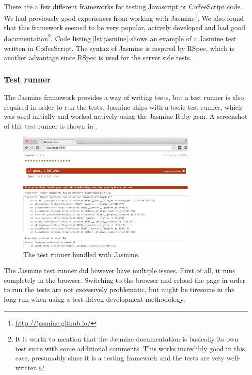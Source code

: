 
\label{sec:js_test}

There are a few different frameworks for testing Javascript or
CoffeeScript code. We had previously good experiences from working with
Jasmine\footnote{\url{http://jasmine.github.io/}}. We also found that
this framework seemed to be very popular, actively developed and had
good documentation\footnote{It is worth to mention that the Jasmine
documentation is basically its own test suite with some additional
comments. This works incredibly good in this case, presumably since it
is a testing framework and the tests are very well-written.}. Code
listing \ref{lst:jasmine} shows an example of a Jasmine test written in
CoffeeScript. The syntax of Jasmine is inspired by RSpec, which is
another advantage since RSpec is used for the server side tests.\\

\subsubsection{Test runner}

The Jasmine framework provides a way of writing tests, but a test runner
is also required in order to run the tests. Jasmine ships with a basic
test runner, which was used initially and worked natively using
the Jasmine Ruby gem. A screenshot of this test runner is shown in
.\\

\begin{figure}
\centering
\includegraphics[width=0.8\textwidth]{results/choices/jasmine_runner}
\caption{The test runner bundled with Jasmine.}
\label{fig:jasmine_runner}
\end{figure}

The Jasmine test runner did however have multiple issues. First of all,
it runs completely in the browser. Switching to the browser and reload
the page in order to run the tests are not excessively problematic, but
might be tiresome in the long run when using a test-driven development
methodology.\\

